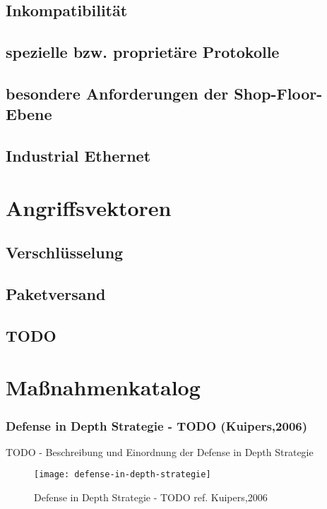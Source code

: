 \subsection{Inkompatibilität}
\subsection{spezielle bzw. proprietäre Protokolle}
\subsection{besondere Anforderungen der Shop-Floor-Ebene}
\subsection{Industrial Ethernet}

\section{Angriffsvektoren}
\subsection{Verschlüsselung}
\subsection{Paketversand}
\subsection{TODO}

\section{Maßnahmenkatalog}
\subsubsection{Defense in Depth Strategie - TODO (Kuipers,2006)}
TODO - Beschreibung und Einordnung der Defense in Depth Strategie

\begin{figure}[h]
    \centering
    \texttt{[image: defense-in-depth-strategie]}
    \caption{Defense in Depth Strategie - TODO ref. Kuipers,2006}
    \label{Kap3:Defense-in-Depth}
\end{figure}